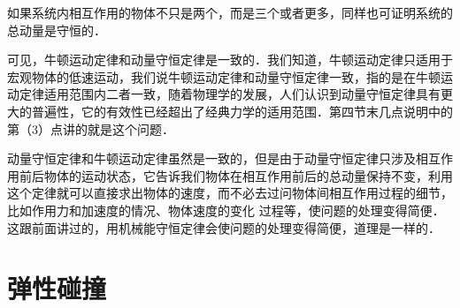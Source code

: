 如果系统内相互作用的物体不只是两个，而是三个或者更多，同样也可证明系统的总动量是守恒的．

可见，牛顿运动定律和动量守恒定律是一致的．我们知道，牛顿运动定律只适用于宏观物体的低速运动，我们说牛顿运动定律和动量守恒定律一致，指的是在牛顿运动定律适用范围内二者一致，随着物理学的发展，人们认识到动量守恒定律具有更大的普遍性，它的有效性已经超出了经典力学的适用范围．第四节末几点说明中的第（3）点讲的就是这个问题．

动量守恒定律和牛顿运动定律虽然是一致的，但是由于动量守恒定律只涉及相互作用前后物体的运动状态，它告诉我们物体在相互作用前后的总动量保持不变，利用这个定律就可以直接求出物体的速度，而不必去过问物体间相互作用过程的细节，比如作用力和加速度的情况、物体速度的变化
过程等，使问题的处理变得简便．这跟前面讲过的，用机械能守恒定律会使问题的处理变得简便，道理是一样的．

\section{弹性碰撞}

